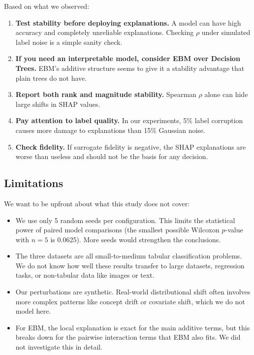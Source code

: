\documentclass[10pt,twocolumn]{article}
\begin{document}
Based on what we observed:
\begin{enumerate}[leftmargin=*,topsep=2pt,itemsep=1pt]
  \item \textbf{Test stability before deploying explanations.} A
    model can have high accuracy and completely unreliable
    explanations. Checking $\rho$ under simulated label noise is
    a simple sanity check.
  \item \textbf{If you need an interpretable model, consider EBM
    over Decision Trees.} EBM's additive structure seems to give
    it a stability advantage that plain trees do not have.
  \item \textbf{Report both rank and magnitude stability.}
    Spearman $\rho$ alone can hide large shifts in SHAP values.
  \item \textbf{Pay attention to label quality.} In our experiments,
    5\% label corruption causes more damage to explanations than
    15\% Gaussian noise.
  \item \textbf{Check fidelity.} If surrogate fidelity is negative,
    the SHAP explanations are worse than useless and should not be
    the basis for any decision.
\end{enumerate}

\subsection{Limitations}

We want to be upfront about what this study does not cover:
\begin{itemize}[leftmargin=*,topsep=2pt,itemsep=1pt]
  \item We use only 5 random seeds per configuration. This limits
    the statistical power of paired model comparisons (the smallest
    possible Wilcoxon $p$-value with $n=5$ is 0.0625). More seeds
    would strengthen the conclusions.
  \item The three datasets are all small-to-medium tabular
    classification problems. We do not know how well these results
    transfer to large datasets, regression tasks, or non-tabular
    data like images or text.
  \item Our perturbations are synthetic. Real-world distributional
    shift often involves more complex patterns like concept drift or
    covariate shift, which we do not model here.
  \item For EBM, the local explanation is exact for the main additive
    terms, but this breaks down for the pairwise interaction terms
    that EBM also fits. We did not investigate this in detail.
\end{itemize}
\end{document}
